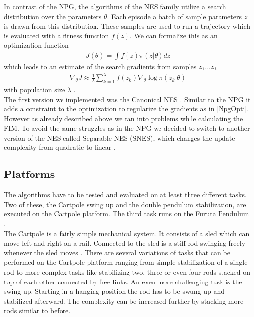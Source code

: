 In contrast of the NPG, the algorithms of the NES family utilize a search distribution over the parameters $\theta$. Each episode a batch of sample parameters $z$ is drawn from this distribution. These samples are used to run a trajectory which is evaluated with a fitness function $f(z)$. We can formalize this as an optimization function
\begin{align}
  J(\theta) = \int f(z) \pi(z|\theta) dz
\end{align}
which leads to an estimate of the search gradients from samples $z_1 ... z_{\lambda}$
\begin{align}
  \nabla_{\theta} J \approx \frac{1}{\lambda} \sum_{k=1}^{\lambda} f(z_k) \nabla_{\theta} \log \pi(z_k|\theta)
\end{align}
with population size $\lambda$ \cite{Wierstra14}. \\
The first version we implemented was the Canonical NES \cite{Wierstra14}. Similar to the NPG it adds a constraint to the optimization to regularize the gradients as in  \autoref{NpgOpti}. However as already described above we ran into problems while calculating the FIM. To avoid the same struggles as in the NPG we decided to switch to another version of the NES called Separable NES (SNES), which changes the update complexity from quadratic to linear \cite{Wierstra14}.

\subsection{Platforms}
\label{plats}
The algorithms have to be tested and evaluated on at least three different tasks. Two of these, the Cartpole swing up and the double pendulum stabilization, are executed on the Cartpole platform. The third task runs on the Furuta Pendulum \cite{Furuta1991}. \\

The Cartpole is a fairly simple mechanical system. It consists of a sled which can move left and right on a rail. Connected to the sled is a stiff rod swinging freely whenever the sled moves \cite{Barto1983}. There are several variations of tasks that can be performed on the Cartpole platform ranging from simple stabilization of a single rod to more complex tasks like stabilizing two, three or even four rods stacked on top of each other connected by free links. An even more challenging task is the swing up. Starting in a hanging position the rod has to be swung up and stabilized afterward. The complexity can be increased further by stacking more rods similar to before. \\

